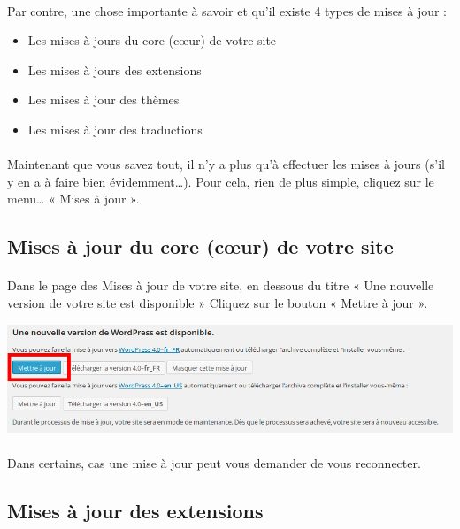 \documentclass[10pt,a4paper]{article}
\begin{document}
\paragraph{}Par contre, une chose importante à savoir et qu'il existe 4 types de mises à jour :
\begin{itemize}
\item Les mises à jours du core (cœur) de votre site
\item Les mises à jours des extensions
\item Les mises à jour des thèmes
\item Les mises à jour des traductions
\end{itemize}
\paragraph{}Maintenant que vous savez tout, il n'y a plus qu'à effectuer les mises à jours (s'il y en a à faire bien évidemment…). Pour cela, rien de plus simple, cliquez sur le menu… « Mises à jour ».
\subsection{Mises à jour du core (cœur) de votre site}
\paragraph{}Dans le page des Mises à jour de votre site, en dessous du titre « Une nouvelle version de votre site est disponible » Cliquez sur le bouton « Mettre à jour ».
\begin{center}
\includegraphics[scale=0.35]{img/0052.png}
\end{center}
\paragraph{}Dans certains, cas une mise à jour peut vous demander de vous reconnecter.
\subsection{Mises à jour des extensions}
\end{document}
